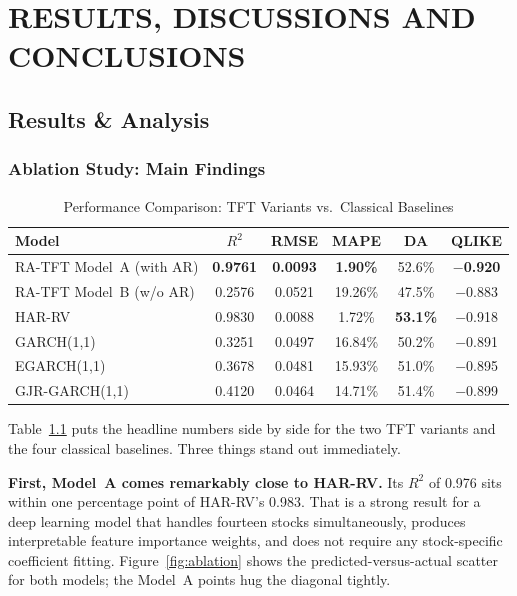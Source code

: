 \chapter{RESULTS, DISCUSSIONS AND CONCLUSIONS}
\label{ChapterResults}

\section{Results \& Analysis}

\subsection{Ablation Study: Main Findings}

\begin{table}[!h]
\caption{Performance Comparison: TFT Variants vs.\ Classical Baselines}
\label{tab:ablation}
\centering
\begin{tabular}{lccccc}
\hline
\textbf{Model} & \textbf{$R^2$} & \textbf{RMSE} & \textbf{MAPE} & \textbf{DA} & \textbf{QLIKE} \\
\hline
RA-TFT Model~A (with AR) & \textbf{0.9761} & \textbf{0.0093} & \textbf{1.90\%} & 52.6\% & \textbf{$-$0.920} \\
RA-TFT Model~B (w/o AR) & 0.2576 & 0.0521 & 19.26\% & 47.5\% & $-$0.883 \\
HAR-RV & 0.9830 & 0.0088 & 1.72\% & \textbf{53.1\%} & $-$0.918 \\
GARCH(1,1) & 0.3251 & 0.0497 & 16.84\% & 50.2\% & $-$0.891 \\
EGARCH(1,1) & 0.3678 & 0.0481 & 15.93\% & 51.0\% & $-$0.895 \\
GJR-GARCH(1,1) & 0.4120 & 0.0464 & 14.71\% & 51.4\% & $-$0.899 \\
\hline
\end{tabular}
\end{table}

Table~\ref{tab:ablation} puts the headline numbers side by side for the two TFT variants and the four classical baselines. Three things stand out immediately.

\textbf{First, Model~A comes remarkably close to HAR-RV.} Its $R^2$ of 0.976 sits within one percentage point of HAR-RV's 0.983. That is a strong result for a deep learning model that handles fourteen stocks simultaneously, produces interpretable feature importance weights, and does not require any stock-specific coefficient fitting. Figure~\ref{fig:ablation} shows the predicted-versus-actual scatter for both models; the Model~A points hug the diagonal tightly.

